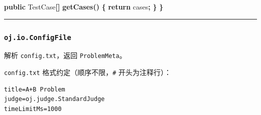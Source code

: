 \documentclass[
  11pt,
]{ctexart}
\newenvironment{Shaded}{\begin{snugshade}}{\end{snugshade}}
\newcommand{\ControlFlowTok}[1]{\textcolor[rgb]{0.13,0.29,0.53}{\textbf{#1}}}
\newcommand{\FunctionTok}[1]{\textcolor[rgb]{0.13,0.29,0.53}{\textbf{#1}}}
\newcommand{\KeywordTok}[1]{\textcolor[rgb]{0.13,0.29,0.53}{\textbf{#1}}}
\newcommand{\NormalTok}[1]{#1}
\newcommand{\OperatorTok}[1]{\textcolor[rgb]{0.81,0.36,0.00}{\textbf{#1}}}
\begin{document}
\begin{Shaded}
\begin{Highlighting}[]
    \KeywordTok{public}\NormalTok{ TestCase}\OperatorTok{[]} \FunctionTok{getCases}\OperatorTok{()} \OperatorTok{\{} \ControlFlowTok{return}\NormalTok{ cases}\OperatorTok{;} \OperatorTok{\}}
\OperatorTok{\}}
\end{Highlighting}
\end{Shaded}

\begin{center}\rule{0.5\linewidth}{0.5pt}\end{center}

\hypertarget{oj.io.configfile}{%
\subsubsection{\texorpdfstring{\texttt{oj.io.ConfigFile}}{oj.io.ConfigFile}}\label{oj.io.configfile}}

解析 \texttt{config.txt}，返回 \texttt{ProblemMeta}。

\texttt{config.txt} 格式约定（顺序不限，\texttt{\#} 开头为注释行）：

\begin{verbatim}
title=A+B Problem
judge=oj.judge.StandardJudge
timeLimitMs=1000
\end{verbatim}
\end{document}
